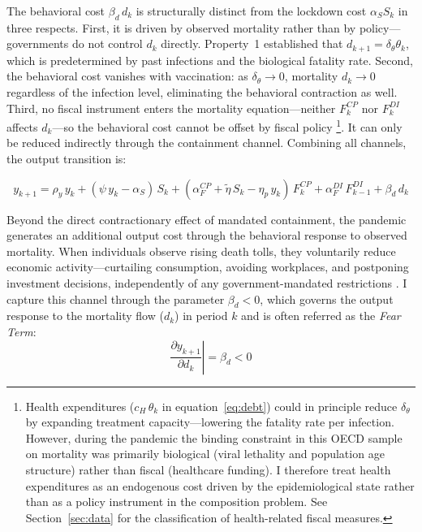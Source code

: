 \noindent The behavioral cost $\beta_d\, d_k$ is structurally distinct from the lockdown cost $\alpha_S S_k$ in three respects. First, it is driven by observed mortality rather than by policy---governments do not control $d_k$ directly. Property~1 established that $d_{k+1} = \delta_\theta \theta_k$, which is predetermined by past infections and the biological fatality rate. Second, the behavioral cost vanishes with vaccination: as $\delta_\theta \to 0$, mortality $d_k \to 0$ regardless of the infection level, eliminating the behavioral contraction as well. Third, no fiscal instrument enters the mortality equation---neither $F^{CP}_k$ nor $F^{DI}_k$ affects $d_k$---so the behavioral cost cannot be offset by fiscal policy \footnote{Health expenditures ($c_H\,\theta_k$ in 
equation~\ref{eq:debt}) could in principle reduce $\delta_\theta$ 
by expanding treatment capacity---lowering the fatality rate per 
infection. However, during the pandemic the binding constraint in this OECD sample on mortality was primarily biological (viral lethality and population 
age structure) rather than fiscal (healthcare funding). I therefore 
treat health expenditures as an endogenous cost driven by the 
epidemiological state rather than as a policy instrument in the 
composition problem. See Section~\ref{sec:data} for the 
classification of health-related fiscal measures.}. It can only be reduced indirectly through the containment channel. Combining all channels, the output transition is:


%
\begin{equation}{
    y_{k+1} = \rho_y\, y_k + (\psi\, y_k - \alpha_S)\, S_k + (\alpha^{CP}_F + \tilde{\eta}\, S_k - \eta_p\, y_k)\, F^{CP}_k + \alpha^{DI}_F\,F^{DI}_{k-1} + \beta_d\, d_k
}
\label{eq:output}
\end{equation}
%


Beyond the direct contractionary effect of mandated containment, the pandemic generates an additional output cost through the behavioral response to observed mortality. When individuals observe rising death tolls, they voluntarily reduce economic activity---curtailing consumption, avoiding workplaces, and postponing investment decisions, independently of any government-mandated restrictions \citep{GOOLSBEE2021}. I capture this channel through the parameter $\beta_d < 0$, which governs the output response to the mortality flow ($d_k$) in period $k$ and is often referred as the \textit{Fear Term}:
%
\begin{equation}
    \left.\frac{\partial y_{k+1}}{\partial d_k}\right| = \beta_d < 0
    \label{eq:fear}
\end{equation}
%

